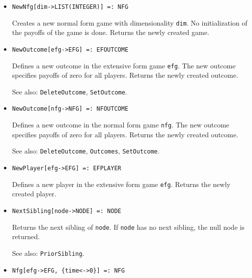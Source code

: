 \begin{itemize}
\item{}
\protect \large \begin{verbatim}
NewNfg[dim->LIST(INTEGER)] =: NFG 
\end{verbatim}\normalsize

\bd 
Creates a new normal form game with dimensionality \verb+dim+.  No
initialization of the payoffs of the game is done.  Returns the newly
created game.  
\ed

\item{}
\protect \large \begin{verbatim} 
NewOutcome[efg->EFG] =: EFOUTCOME 
\end{verbatim}\normalsize


\bd 
Defines a new outcome in the extensive form game \verb+efg+.  The new
outcome specifies payoffs of zero for all players.  Returns the newly
created outcome.
\item [See also:] \verb+DeleteOutcome+, \verb+SetOutcome+.
\ed


\item{}
\protect \large \begin{verbatim} 
NewOutcome[nfg->NFG] =: NFOUTCOME 
\end{verbatim}\normalsize

\bd 
Defines a new outcome in the normal form game \verb+nfg+.  The new
outcome specifies payoffs of zero for all players.  Returns the newly
created outcome.
\item [See also:] \verb+DeleteOutcome+, \verb+Outcomes+,
\verb+SetOutcome+.
\ed


\item{}
\protect \large \begin{verbatim}
NewPlayer[efg->EFG] =: EFPLAYER 
\end{verbatim}\normalsize

\bd 
Defines a new player in the extensive form game \verb+efg+.  Returns
the newly created player.  
\ed

\item{}
\protect \large \begin{verbatim}
NextSibling[node->NODE] =: NODE 
\end{verbatim}\normalsize

\bd
Returns the next sibling of \verb+node+.  If \verb+node+ has no next
sibling, the null node is returned.
\item [See also:] \verb+PriorSibling+.
\ed

\item{}
\protect \large \begin{verbatim}
Nfg[efg->EFG, {time<->0}] =: NFG 
\end{verbatim}\normalsize


\end{itemize}
